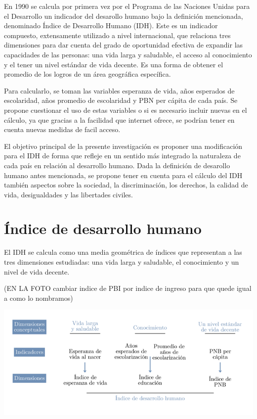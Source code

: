 \documentclass[
  10pt,
]{article}
\begin{document}
En 1990 se calcula por primera vez por el Programa de las Naciones
Unidas para el Desarrollo un indicador del desarollo humano bajo la
definición mencionada, denominado Índice de Desarrollo Humano (IDH).
Este es un indicador compuesto, extensamente utilizado a nivel
internacional, que relaciona tres dimensiones para dar cuenta del grado
de oportunidad efectiva de expandir las capacidades de las personas: una
vida larga y saludable, el acceso al conocimiento y el tener un nivel
estándar de vida decente. Es una forma de obtener el promedio de los
logros de un área geográfica específica.

Para calcularlo, se toman las variables esperanza de vida, años
esperados de escolaridad, años promedio de escolaridad y PBN per cápita
de cada país. Se propone cuestionar el uso de estas variables o si es
necesario incluir nuevas en el cálculo, ya que gracias a la facilidad
que internet ofrece, se podrían tener en cuenta nuevas medidas de facil
acceso.

El objetivo principal de la presente investigación es proponer una
modificación para el IDH de forma que refleje en un sentido más
integrado la naturaleza de cada país en relación al desarrollo humano.
Dada la definición de desarollo humano antes mencionada, se propone
tener en cuenta para el cálculo del IDH también aspectos sobre la
sociedad, la discriminación, los derechos, la calidad de vida,
desigualdades y las libertades civiles.

\pagebreak

\hypertarget{uxedndice-de-desarrollo-humano}{%
\section{Índice de desarrollo
humano}\label{uxedndice-de-desarrollo-humano}}

El IDH se calcula como una media geométrica de índices que representan a
las tres dimensiones estudiadas: una vida larga y saludable, el
conocimiento y un nivel de vida decente.

(EN LA FOTO cambiar indice de PBI por indice de ingreso para que quede
igual a como lo nombramos)

\includegraphics{diagrama1.png}
\end{document}
